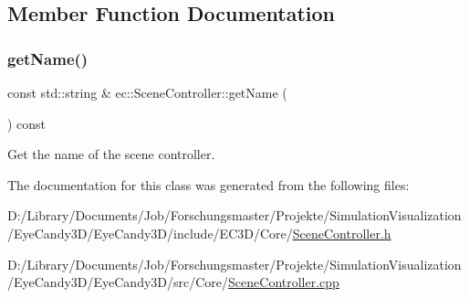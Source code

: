 \subsection{Member Function Documentation}
\mbox{\label{classec_1_1_scene_controller_af45d2fce41110dc9a128b900bde8ba14}} 
\subsubsection{\texorpdfstring{get\+Name()}{getName()}}
{\footnotesize\ttfamily const std\+::string \& ec\+::\+Scene\+Controller\+::get\+Name (\begin{DoxyParamCaption}{ }\end{DoxyParamCaption}) const}



Get the name of the scene controller. 



The documentation for this class was generated from the following files\+:\begin{DoxyCompactItemize}
\item 
D\+:/\+Library/\+Documents/\+Job/\+Forschungsmaster/\+Projekte/\+Simulation\+Visualization/\+Eye\+Candy3\+D/\+Eye\+Candy3\+D/include/\+E\+C3\+D/\+Core/\mbox{\hyperlink{_scene_controller_8h}{Scene\+Controller.\+h}}\item 
D\+:/\+Library/\+Documents/\+Job/\+Forschungsmaster/\+Projekte/\+Simulation\+Visualization/\+Eye\+Candy3\+D/\+Eye\+Candy3\+D/src/\+Core/\mbox{\hyperlink{_scene_controller_8cpp}{Scene\+Controller.\+cpp}}\end{DoxyCompactItemize}
